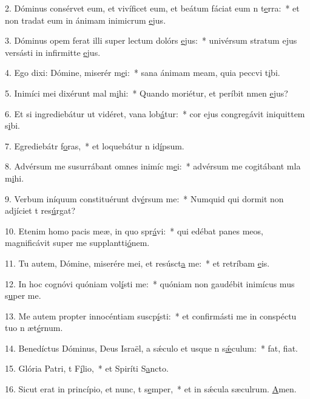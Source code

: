 2. Dóminus consérvet eum, et vivíficet eum, et beátum fáciat eum n t\uline{e}rra:~* et non tradat eum in ánimam inimicrum \uline{e}jus.\par 
3. Dóminus opem ferat illi super lectum dolórs \uline{e}jus:~* univérsum stratum ejus versásti in infirmitte \uline{e}jus.\par 
4. Ego dixi: Dómine, miserér m\uline{e}i:~* sana ánimam meam, quia peccvi t\uline{i}bi.\par 
5. Inimíci mei dixérunt mal m\uline{i}hi:~* Quando moriétur, et períbit nmen \uline{e}jus?\par 
6. Et si ingrediebátur ut vidéret, vana lob\uline{á}tur:~* cor ejus congregávit iniquittem s\uline{i}bi.\par 
7. Egrediebátr f\uline{o}ras,~* et loquebátur n id\uline{í}psum.\par 
8. Advérsum me susurrábant omnes inimíc m\uline{e}i:~* advérsum me cogitábant mla m\uline{i}hi.\par 
9. Verbum iníquum constituérunt dv\uline{é}rsum me:~* Numquid qui dormit non adjíciet t res\uline{ú}rgat?\par 
10. Etenim homo pacis meæ, in quo spr\uline{á}vi:~* qui edébat panes meos, magnificávit super me supplantti\uline{ó}nem.\par 
11. Tu autem, Dómine, miserére mei, et resúsct\uline{a} me:~* et retríbam \uline{e}is.\par 
12. In hoc cognóvi quóniam vol\uline{í}sti me:~* quóniam non gaudébit inimícus mus s\uline{u}per me.\par 
13. Me autem propter innocéntiam suscp\uline{í}sti:~* et confirmásti me in conspéctu tuo n æt\uline{é}rnum.\par 
14. Benedíctus Dóminus, Deus Israël, a sǽculo et usque n s\uline{ǽ}culum:~* fat, f\uline{i}at.\par 
15. Glória Patri, t F\uline{í}lio,~* et Spiríti S\uline{a}ncto.\par 
16. Sicut erat in princípio, et nunc, t s\uline{e}mper,~* et in sǽcula sæculrum. \uline{A}men.\par 
